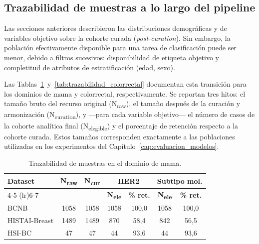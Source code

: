 \subsection{Trazabilidad de muestras a lo largo del pipeline}
\label{sec:trazabilidad_muestras}

Las secciones anteriores describieron las distribuciones demográficas y de variables objetivo sobre la cohorte curada (\textit{post-curation}). Sin embargo, la población efectivamente disponible para una tarea de clasificación puede ser menor, debido a filtros sucesivos: disponibilidad de etiqueta objetivo y completitud de atributos de estratificación (edad, sexo).

Las Tablas~\ref{tab:trazabilidad_mama}~y~\ref{tab:trazabilidad_colorrectal} documentan esta transición para los dominios de mama y colorrectal, respectivamente. Se reportan tres hitos: el tamaño bruto del recurso original (N\textsubscript{raw}), el tamaño después de la curación y armonización (N\textsubscript{curation}), y —para cada variable objetivo— el número de casos de la cohorte analítica final (N\textsubscript{elegible}) y el porcentaje de retención respecto a la cohorte curada. Estos tamaños corresponden exactamente a las poblaciones utilizadas en los experimentos del Capítulo~\ref{cap:evaluacion_modelos}.

\begin{table}[htbp]
\centering
\caption{Trazabilidad de muestras en el dominio de mama.}
\label{tab:trazabilidad_mama}
\footnotesize
\setlength{\tabcolsep}{4pt}
\begin{tabular}{lcccccc}
\toprule
\multirow{2}{*}{\textbf{Dataset}} & \multirow{2}{*}{\textbf{N\textsubscript{raw}}} & \multirow{2}{*}{\textbf{N\textsubscript{cur}}}
  & \multicolumn{2}{c}{\textbf{HER2}} & \multicolumn{2}{c}{\textbf{Subtipo mol.}} \\
\cmidrule(lr){4-5} \cmidrule(lr){6-7}
& & & \textbf{N\textsubscript{ele}} & \textbf{\% ret.} & \textbf{N\textsubscript{ele}} & \textbf{\% ret.} \\
\midrule
BCNB & 1058 & 1058 & 1058 & 100,0 & 1058 & 100,0 \\
HISTAI-Breast & 1489 & 1489 & 870 & 58,4 & 842 & 56,5 \\
HSI-BC & 47 & 47 & 44 & 93,6 & 44 & 93,6 \\
\bottomrule
\end{tabular}
\end{table}

